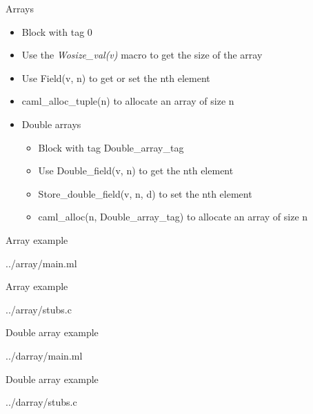\documentclass{beamer}
\begin{document}
\begin{frame}{Arrays}
\begin{itemize}
    \item Block with tag 0
    \item Use the \emph{Wosize\_val(v)} macro to get the size of the array
    \item Use Field(v, n) to get or set the nth element
    \item caml\_alloc\_tuple(n) to allocate an array of size n
    \item Double arrays
    \begin{itemize}
        \item Block with tag Double\_array\_tag
        \item Use Double\_field(v, n) to get the nth element
        \item Store\_double\_field(v, n, d) to set the nth element
        \item caml\_alloc(n, Double\_array\_tag) to allocate an array of size n
    \end{itemize}
\end{itemize}
\end{frame}

\begin{frame}[fragile]{Array example}
\begin{lstinputlisting}[language=ML]{../array/main.ml}
\end{lstinputlisting}
\end{frame}

\begin{frame}[fragile,shrink=5]{Array example}
\begin{lstinputlisting}[language=C]{../array/stubs.c}
\end{lstinputlisting}
\end{frame}

\begin{frame}[fragile]{Double array example}
\begin{lstinputlisting}[language=ML]{../darray/main.ml}
\end{lstinputlisting}
\end{frame}

\begin{frame}[fragile,shrink=5]{Double array example}
\begin{lstinputlisting}[language=C]{../darray/stubs.c}
\end{lstinputlisting}
\end{frame}
\end{document}
